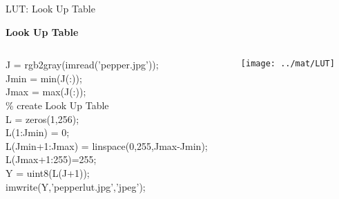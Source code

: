 %
%
\begin{slide}{LUT: Look Up Table}
\begin{bulletlist} %
\small
\item<2-> \textbf{Look Up Table}
\begin{columns}
\begin{column}{0.5\textwidth}
\begin{code}[7]{}
J = rgb2gray(imread('pepper.jpg')); \\
Jmin = min(J(:));\\
Jmax = max(J(:));\\

\% create Look Up Table \\
L = zeros(1,256);\\
L(1:Jmin) = 0;\\
L(Jmin+1:Jmax) = linspace(0,255,Jmax-Jmin);\\
L(Jmax+1:255)=255;\\

Y = uint8(L(J+1));\\
imwrite(Y,'pepperlut.jpg','jpeg');\\

\end{code}
\end{column}
\begin{column}{0.5\textwidth}
\begin{center}
\texttt{[image: ../mat/LUT]}
\end{center}

\end{column}
\end{columns}


%
%
%
%
%

\end{bulletlist}

\end{slide}


